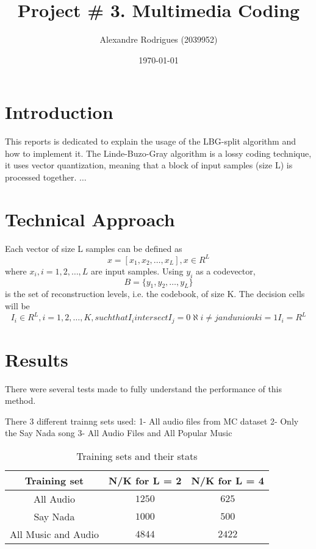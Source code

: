 \documentclass[a4paper, 11pt]{article}
\begin{document}
	
	\title{Project \# 3. Multimedia Coding }
	\author{{\small Alexandre Rodrigues (2039952)}}
	\date{\today}
	\maketitle
	
	\section{Introduction}
		This reports is dedicated to explain the usage of the LBG-split algorithm and how to implement it.
		The Linde-Buzo-Gray algorithm is a lossy coding technique, it uses vector quantization, meaning that a block of input samples (size L) is processed together.
		$\ldots$
	
	\section{Technical Approach}
		Each vector of size L samples can be defined as
		\begin{equation}
			x = [x_1, x_2, \ldots, x_L], x \in R^L
		\end{equation}
		where $x_i, i=1,2,\ldots,L$ are input samples. 
		Using $y_i $ as a codevector, 
		\begin{equation}
			B =  \{y_1, y_2, \ldots, y_L\}
		\end{equation} 
		is the set of reconstruction levels, i.e. the codebook, of size K.
		The decision cells will be
		\begin{equation}
			I_i \in R^L, i = 1, 2, \ldots, K, such that I_i intersect I_j = 0 \aleph i \neq j and union k i=1 I_i = R^L
		\end{equation} 
		
	
	\section{Results}
		There were several tests made to fully understand the performance of this method.
		
		There 3 different trainng sets used:
			1- All audio files from MC dataset
			2- Only the Say Nada song
			3- All Audio Files and All Popular Music
			
		\begin{table}[H]
			\centering
			\begin{tabular}{c|c|c}
				\textbf{Training set} & \textbf{N/K for L = 2} 	& \textbf{N/K for L = 4} \\ \hline
				All Audio 			& $ 1250 $ 					& $ 625 $	 			 \\ \hline
				Say Nada			& $ 1000 $ 				  	& $ 500 $ \\ \hline	
				All Music and Audio & $ 4844 $					& $	2422 $ \\
			\end{tabular}
			\caption{Training sets and their stats}
			\label{table:TrainSets}
		\end{table}
		
\end{document}

